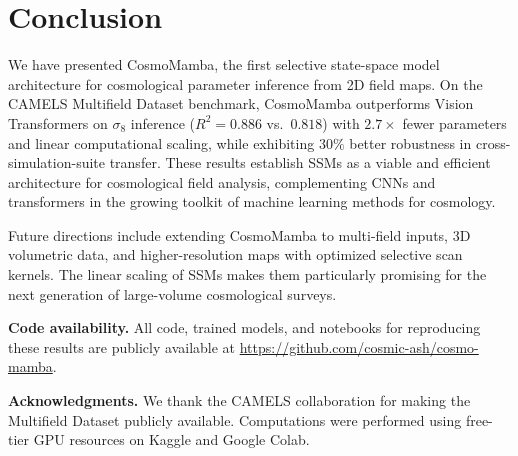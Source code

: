 \documentclass[twocolumn,showpacs,preprintnumbers,amsmath,amssymb,aps,prd]{revtex4-2}
\newcommand{\sig}{\sigma_8}
\newcommand{\Rsq}{R^2}
\begin{document}
\section{Conclusion}
\label{sec:conclusion}

We have presented CosmoMamba, the first selective state-space model architecture for
cosmological parameter inference from 2D field maps. On the CAMELS Multifield Dataset
benchmark, CosmoMamba outperforms Vision Transformers on $\sig$ inference
($\Rsq = 0.886$ vs.\ $0.818$) with $2.7\times$ fewer parameters and linear computational
scaling, while exhibiting $30\%$ better robustness in cross-simulation-suite transfer.
These results establish SSMs as a viable and efficient architecture for cosmological field
analysis, complementing CNNs and transformers in the growing toolkit of machine learning
methods for cosmology.

Future directions include extending CosmoMamba to multi-field inputs, 3D volumetric data,
and higher-resolution maps with optimized selective scan kernels. The linear scaling of
SSMs makes them particularly promising for the next generation of large-volume cosmological
surveys.

\vspace{0.5em}
\noindent\textbf{Code availability.}
All code, trained models, and notebooks for reproducing these results are publicly
available at \url{https://github.com/cosmic-ash/cosmo-mamba}.

\vspace{0.5em}
\noindent\textbf{Acknowledgments.}
We thank the CAMELS collaboration for making the Multifield Dataset publicly available.
Computations were performed using free-tier GPU resources on Kaggle and Google Colab.


\end{document}
